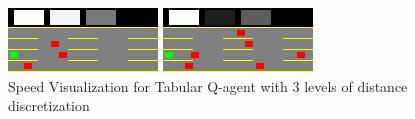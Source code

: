 \begin{figure}[H]
    \centering
    \begin{minipage}{0.48\textwidth}
        \centering
        \includegraphics[width=\linewidth]{plots/part1-e.2-speed_visualization_00_step_0120.png}
    \end{minipage}
    \hfill
    \begin{minipage}{0.48\textwidth}
        \centering
        \includegraphics[width=\linewidth]{plots/part1-e.2-speed_visualization_00_step_0140.png}
    \end{minipage}
    \caption{Speed Visualization for Tabular Q-agent with $3$ levels of distance discretization}
    \label{fig:part1-e.2-speed-visualization}
\end{figure}
